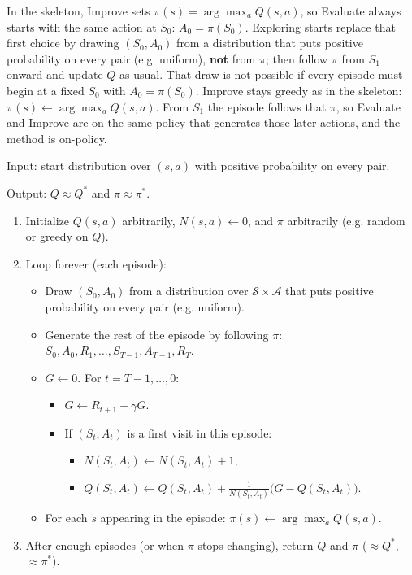 In the skeleton, Improve sets $\pi(s)=\arg\max_a Q(s,a)$, so Evaluate always starts with the same action at $S_0$: $A_0=\pi(S_0)$. Exploring starts replace that first choice by drawing $(S_0,A_0)$ from a distribution that puts positive probability on every pair (e.g. uniform), \textbf{not} from $\pi$; then follow $\pi$ from $S_1$ onward and update $Q$ as usual. That draw is not possible if every episode must begin at a fixed $S_0$ with $A_0=\pi(S_0)$. Improve stays greedy as in the skeleton: $\pi(s)\leftarrow\arg\max_a Q(s,a)$. From $S_1$ the episode follows that $\pi$, so Evaluate and Improve are on the same policy that generates those later actions, and the method is on-policy.
\begin{implnote}
Input: start distribution over $(s,a)$ with positive probability on every pair.

Output: $Q\approx Q^*$ and $\pi\approx\pi^*$.

\begin{enumerate}
\item Initialize $Q(s,a)$ arbitrarily, $N(s,a)\leftarrow 0$, and $\pi$ arbitrarily (e.g. random or greedy on $Q$).
\item Loop forever (each episode):
\begin{itemize}
\item Draw $(S_0,A_0)$ from a distribution over $\mathcal{S}\times\mathcal{A}$ that puts positive probability on every pair (e.g. uniform).
\item Generate the rest of the episode by following $\pi$: $S_0,A_0,R_1,\ldots,S_{T-1},A_{T-1},R_T$.
\item $G\leftarrow 0$. For $t=T{-}1,\ldots,0$:
\begin{itemize}
\item $G\leftarrow R_{t+1}+\gamma G$.
\item If $(S_t,A_t)$ is a first visit in this episode:
\begin{itemize}
\item $N(S_t,A_t)\leftarrow N(S_t,A_t)+1$,
\item $Q(S_t,A_t)\leftarrow Q(S_t,A_t)+\frac{1}{N(S_t,A_t)}\bigl(G-Q(S_t,A_t)\bigr)$.
\end{itemize}
\end{itemize}
\item For each $s$ appearing in the episode: $\pi(s)\leftarrow\arg\max_a Q(s,a)$.
\end{itemize}
\item After enough episodes (or when $\pi$ stops changing), return $Q$ and $\pi$ ($\approx Q^*$, $\approx\pi^*$).
\end{enumerate}

\end{implnote}


